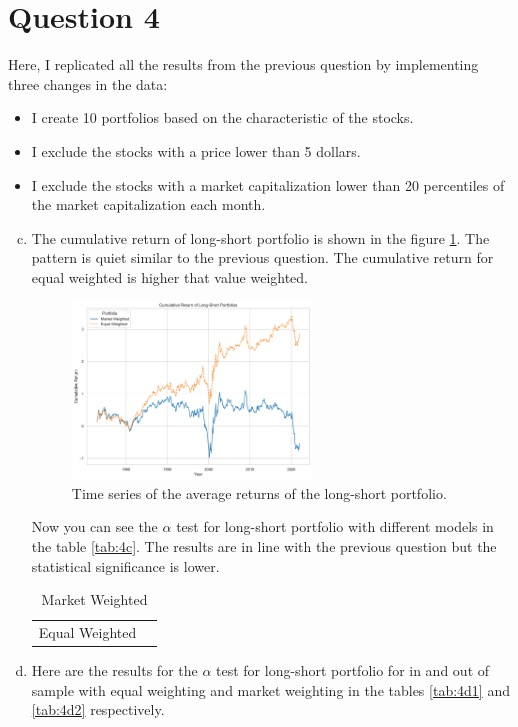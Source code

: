 \section*{Question 4}
Here, I replicated all the results from the previous question by implementing three changes in the data:
\begin{itemize}
    \item I create 10 portfolios based on the characteristic of the stocks.
    \item I exclude the stocks with a price lower than 5 dollars.
    \item I exclude the stocks with a market capitalization lower than 20 percentiles of the market capitalization each month.
\end{itemize}

\begin{enumerate}[(a)]
    \setcounter{enumi}{2}
\item 
The cumulative return of long-short portfolio is shown in the figure \ref{fig:4c}. The pattern is quiet similar to the previous question. The cumulative return for equal weighted is higher that value weighted. 

\begin{figure}
    \centering
    \includegraphics[width=0.6\textwidth]{Out/4_3.pdf}
    \caption{Time series of the average returns of the long-short portfolio.}
    \label{fig:4c}
\end{figure}

Now you can see the $\alpha$ test for long-short portfolio with different models in the table \ref{tab:4c}. The results are in line with the previous question but the statistical significance is lower.

\begin{table}[htbp]
    \caption{$\alpha$ test for long-short portfolio with different models}
    \begin{tabularx}{\linewidth}{CC}
        \caption*{Equal Weighted }
        
        &
        \caption*{Market Weighted }
        
    \end{tabularx}
\end{table}
\item Here are the results for the $\alpha$ test for long-short portfolio for in and out of sample with equal weighting and market weighting in the tables \ref{tab:4d1} and \ref{tab:4d2} respectively. 


\end{enumerate}
